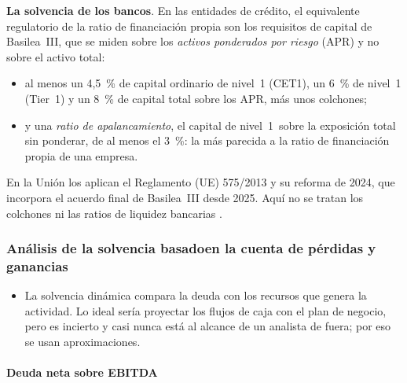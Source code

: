 \documentclass[11pt]{article}
\begin{document}
\begin{anotaciones}
\textbf{La solvencia de los bancos}. En las entidades de crédito, el equivalente regulatorio de la ratio de financiación propia son los requisitos de capital de Basilea~III, que se miden sobre los \emph{activos ponderados por riesgo} (APR) y no sobre el activo total:
\begin{itemize}
\item al menos un 4,5~\% de capital ordinario de nivel~1 (CET1), un 6~\% de nivel~1 (Tier~1) y un 8~\% de capital total sobre los APR, más unos colchones;
\item y una \emph{ratio de apalancamiento}, el capital de nivel~1~sobre la exposición total sin ponderar, de al menos el 3~\%: la más parecida a la ratio de financiación propia de una empresa\nocite{BCBS2011Basilea3,BCBS2017Basel3}.
\end{itemize}
En la Unión los aplican el Reglamento (UE) 575/2013 y su reforma de 2024, que incorpora el acuerdo final de Basilea~III desde 2025\nocite{RegUE2013CRR,RegUE2024CRR3}. Aquí no se tratan los colchones ni las ratios de liquidez bancarias .
\end{anotaciones}

\subsubsection{Análisis de la solvencia basado\cortetitulo en la cuenta de pérdidas y ganancias}\label{sec:solvencia-pyg}

\begin{itemize}
\item La solvencia dinámica compara la deuda con los recursos que genera la actividad. Lo ideal sería proyectar los flujos de caja con el plan de negocio, pero es incierto y casi nunca está al alcance de un analista de fuera; por eso se usan aproximaciones.
\end{itemize}

\paragraph{Deuda neta sobre EBITDA}
\end{document}

